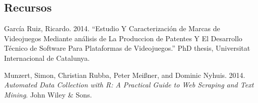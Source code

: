 \documentclass[]{article}
\begin{document}
\clearpage

\subsection*{Recursos}\label{recursos}

\hypertarget{refs}{}
\hypertarget{ref-ruiz2014estudio}{}
García Ruiz, Ricardo. 2014. ``Estudio Y Caracterización de Marcas de
Videojuegos Mediante análisis de La Produccion de Patentes Y El
Desarrollo Técnico de Software Para Plataformas de Videojuegos.''
PhD thesis, Universitat Internacional de Catalunya.

\hypertarget{ref-munzert2014automated}{}
Munzert, Simon, Christian Rubba, Peter Meißner, and Dominic Nyhuis.
2014. \emph{Automated Data Collection with R: A Practical Guide to Web
Scraping and Text Mining}. John Wiley \& Sons.
\end{document}
